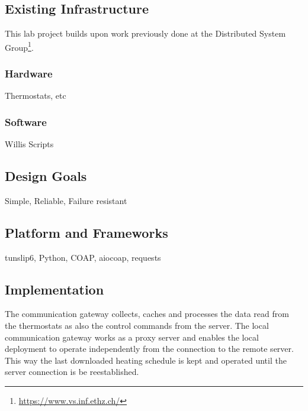 \subsection{Existing Infrastructure}

This lab project builds upon work previously done at the Distributed System Group\footnote{\url{https://www.vs.inf.ethz.ch/}}. 

\subsubsection*{Hardware}

Thermostats, etc

\subsubsection*{Software}

Willis Scripts

\subsection{Design Goals}

Simple, Reliable, Failure resistant

\subsection{Platform and Frameworks}

tunslip6, Python, COAP, aiocoap, requests

\subsection{Implementation}

The communication gateway collects, caches and processes the data read from the thermostats as also the control commands from the server. The local communication gateway works as a proxy server and enables the local deployment to operate independently from the connection to the remote server. This way the last downloaded heating schedule is kept and operated until the server connection is be reestablished. 

